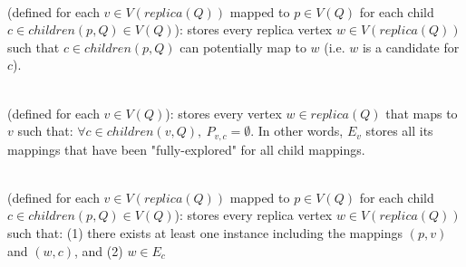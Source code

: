 


 \\
(defined for each $v\in V(replica(Q))$ mapped to $p\in V(Q)$ for each child
$c\in children(p,Q) \in V(Q)$): stores every replica vertex $w\in
V(replica(Q))$ such that $c\in children(p,Q)$ can potentially map to $w$ (i.e. $w$ is
a candidate for $c$).

 \\
(defined for each $v\in V(Q)$): stores every vertex $w\in replica(Q)$ that maps
to $v$ such that: $\forall c\in children(v,Q),\ P_{v,c}=\emptyset$. In other
words, $E_{v}$ stores all its mappings that have been "fully-explored" for all
child mappings. 


 \\
(defined for each $v\in V(replica(Q))$ mapped to $p\in V(Q)$ for each child
$c\in children(p,Q) \in V(Q)$): stores every replica vertex $w\in V(replica(Q))$
such that: (1) there exists at least one instance including the mappings $(p, v)$ and
$(w,c)$, and (2) $w \in E_{c}$  


